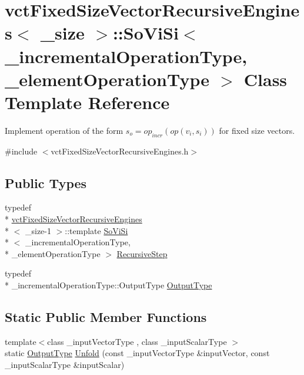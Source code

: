 \hypertarget{classvct_fixed_size_vector_recursive_engines_1_1_so_vi_si}{\section{vct\-Fixed\-Size\-Vector\-Recursive\-Engines$<$ \-\_\-size $>$\-:\-:So\-Vi\-Si$<$ \-\_\-incremental\-Operation\-Type, \-\_\-element\-Operation\-Type $>$ Class Template Reference}
\label{classvct_fixed_size_vector_recursive_engines_1_1_so_vi_si}
}


Implement operation of the form $s_o = op_{incr}(op(v_i, s_i))$ for fixed size vectors.  




{\ttfamily \#include $<$vct\-Fixed\-Size\-Vector\-Recursive\-Engines.\-h$>$}

\subsection*{Public Types}
\begin{DoxyCompactItemize}
\item 
typedef \\*
\hyperlink{classvct_fixed_size_vector_recursive_engines}{vct\-Fixed\-Size\-Vector\-Recursive\-Engines}\\*
$<$ \-\_\-size-\/1 $>$\-::template \hyperlink{classvct_fixed_size_vector_recursive_engines_1_1_so_vi_si}{So\-Vi\-Si}\\*
$<$ \-\_\-incremental\-Operation\-Type, \\*
\-\_\-element\-Operation\-Type $>$ \hyperlink{classvct_fixed_size_vector_recursive_engines_1_1_so_vi_si_a595f643d9cca8d3c8a84a4c680679ad0}{Recursive\-Step}
\item 
typedef \\*
\-\_\-incremental\-Operation\-Type\-::\-Output\-Type \hyperlink{classvct_fixed_size_vector_recursive_engines_1_1_so_vi_si_a44d1ef1068c419fc926e4fd821d08402}{Output\-Type}
\end{DoxyCompactItemize}
\subsection*{Static Public Member Functions}
\begin{DoxyCompactItemize}
\item 
{\footnotesize template$<$class \-\_\-input\-Vector\-Type , class \-\_\-input\-Scalar\-Type $>$ }\\static \hyperlink{classvct_fixed_size_vector_recursive_engines_1_1_so_vi_si_a44d1ef1068c419fc926e4fd821d08402}{Output\-Type} \hyperlink{classvct_fixed_size_vector_recursive_engines_1_1_so_vi_si_a06e896ac6b470c5cf0427ab841c7c75c}{Unfold} (const \-\_\-input\-Vector\-Type \&input\-Vector, const \-\_\-input\-Scalar\-Type \&input\-Scalar)
\end{DoxyCompactItemize}


